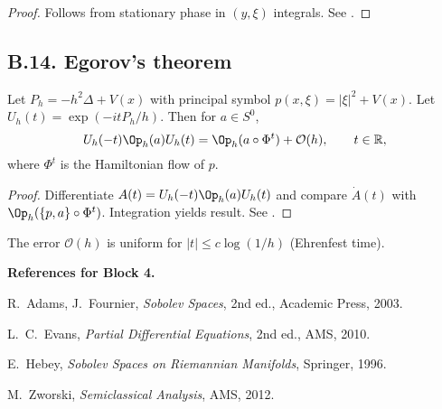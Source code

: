 \begin{proof}
Follows from stationary phase in $(y,\xi)$ integrals. See \cite[Thm.~4.18]{Zworski}.
\end{proof}

\subsection*{B.14. Egorov’s theorem}
\label{appB:egorov}

\begin{theorem}
\label{thm:egorov}
Let $P_h = -h^2\Delta + V(x)$ with principal symbol $p(x,\xi)=|\xi|^2+V(x)$. Let $U_h(t)=\exp(-itP_h/h)$. Then for $a\in S^0$,
\[
U_h(-t)\Op_h(a)U_h(t) = \Op_h(a\circ \Phi^t) + \mathcal{O}(h),\qquad t\in\mathbb{R},
\]
where $\Phi^t$ is the Hamiltonian flow of $p$.
\end{theorem}

\begin{proof}
Differentiate $A(t)=U_h(-t)\Op_h(a)U_h(t)$ and compare $\dot A(t)$ with $\Op_h(\{p,a\}\circ \Phi^t)$. Integration yields result. See \cite[Thm.~11.1]{Zworski}.
\end{proof}

\begin{remark}
The error $\mathcal{O}(h)$ is uniform for $|t|\le c\log(1/h)$ (Ehrenfest time).
\end{remark}

\medskip

\noindent\textbf{References for Block 4.}
\begin{thebibliography}{99}

R.~Adams, J.~Fournier, \emph{Sobolev Spaces}, 2nd ed., Academic Press, 2003.

L.~C.~Evans, \emph{Partial Differential Equations}, 2nd ed., AMS, 2010.

E.~Hebey, \emph{Sobolev Spaces on Riemannian Manifolds}, Springer, 1996.

M.~Zworski, \emph{Semiclassical Analysis}, AMS, 2012.

\end{thebibliography}


